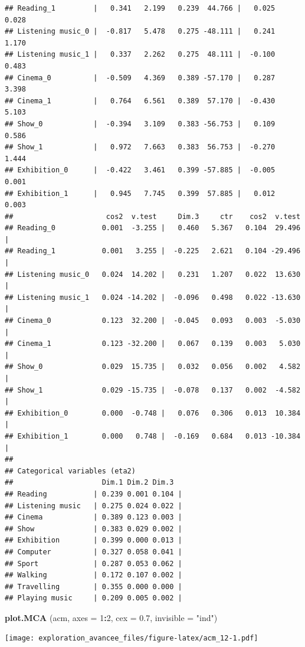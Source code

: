 \documentclass[]{book}
\newenvironment{Shaded}{\begin{snugshade}}{\end{snugshade}}
\newcommand{\DataTypeTok}[1]{\textcolor[rgb]{0.13,0.29,0.53}{#1}}
\newcommand{\DecValTok}[1]{\textcolor[rgb]{0.00,0.00,0.81}{#1}}
\newcommand{\FloatTok}[1]{\textcolor[rgb]{0.00,0.00,0.81}{#1}}
\newcommand{\KeywordTok}[1]{\textcolor[rgb]{0.13,0.29,0.53}{\textbf{#1}}}
\newcommand{\NormalTok}[1]{#1}
\newcommand{\OperatorTok}[1]{\textcolor[rgb]{0.81,0.36,0.00}{\textbf{#1}}}
\newcommand{\StringTok}[1]{\textcolor[rgb]{0.31,0.60,0.02}{#1}}
\begin{document}
\begin{verbatim}
## Reading_1         |   0.341   2.199   0.239  44.766 |   0.025   0.028
## Listening music_0 |  -0.817   5.478   0.275 -48.111 |   0.241   1.170
## Listening music_1 |   0.337   2.262   0.275  48.111 |  -0.100   0.483
## Cinema_0          |  -0.509   4.369   0.389 -57.170 |   0.287   3.398
## Cinema_1          |   0.764   6.561   0.389  57.170 |  -0.430   5.103
## Show_0            |  -0.394   3.109   0.383 -56.753 |   0.109   0.586
## Show_1            |   0.972   7.663   0.383  56.753 |  -0.270   1.444
## Exhibition_0      |  -0.422   3.461   0.399 -57.885 |  -0.005   0.001
## Exhibition_1      |   0.945   7.745   0.399  57.885 |   0.012   0.003
##                      cos2  v.test     Dim.3     ctr    cos2  v.test  
## Reading_0           0.001  -3.255 |   0.460   5.367   0.104  29.496 |
## Reading_1           0.001   3.255 |  -0.225   2.621   0.104 -29.496 |
## Listening music_0   0.024  14.202 |   0.231   1.207   0.022  13.630 |
## Listening music_1   0.024 -14.202 |  -0.096   0.498   0.022 -13.630 |
## Cinema_0            0.123  32.200 |  -0.045   0.093   0.003  -5.030 |
## Cinema_1            0.123 -32.200 |   0.067   0.139   0.003   5.030 |
## Show_0              0.029  15.735 |   0.032   0.056   0.002   4.582 |
## Show_1              0.029 -15.735 |  -0.078   0.137   0.002  -4.582 |
## Exhibition_0        0.000  -0.748 |   0.076   0.306   0.013  10.384 |
## Exhibition_1        0.000   0.748 |  -0.169   0.684   0.013 -10.384 |
## 
## Categorical variables (eta2)
##                     Dim.1 Dim.2 Dim.3  
## Reading           | 0.239 0.001 0.104 |
## Listening music   | 0.275 0.024 0.022 |
## Cinema            | 0.389 0.123 0.003 |
## Show              | 0.383 0.029 0.002 |
## Exhibition        | 0.399 0.000 0.013 |
## Computer          | 0.327 0.058 0.041 |
## Sport             | 0.287 0.053 0.062 |
## Walking           | 0.172 0.107 0.002 |
## Travelling        | 0.355 0.000 0.000 |
## Playing music     | 0.209 0.005 0.002 |
\end{verbatim}

\begin{Shaded}
\begin{Highlighting}[]
\KeywordTok{plot.MCA}\NormalTok{ (acm, }\DataTypeTok{axes =} \DecValTok{1}\OperatorTok{:}\DecValTok{2}\NormalTok{, }\DataTypeTok{cex =} \FloatTok{0.7}\NormalTok{, }\DataTypeTok{invisible =} \StringTok{"ind"}\NormalTok{)}
\end{Highlighting}
\end{Shaded}

\texttt{[image: exploration\_avancee\_files/figure-latex/acm\_12-1.pdf]}
\end{document}
